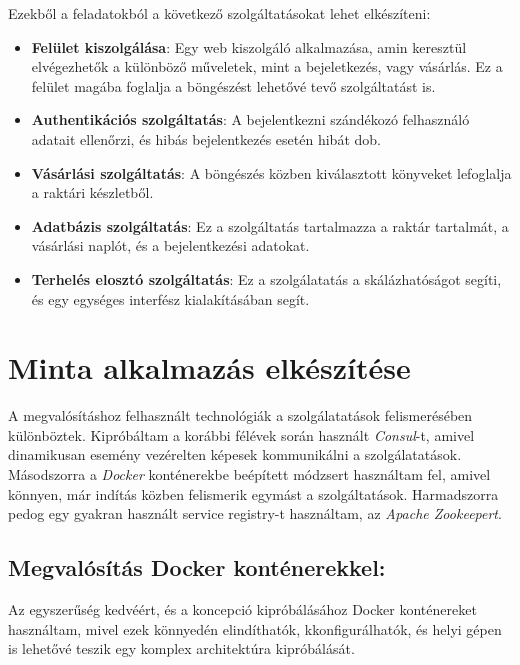 \documentclass[11pt,magyar,a4paper,oneside,]{report}
\providecommand{\tightlist}{%
  \setlength{\itemsep}{0pt}\setlength{\parskip}{0pt}}
\begin{document}
Ezekből a feladatokból a következő szolgáltatásokat lehet elkészíteni:

\begin{itemize}
\tightlist
\item
  \textbf{Felület kiszolgálása}: Egy web kiszolgáló alkalmazása, amin
  keresztül elvégezhetők a különböző műveletek, mint a bejeletkezés,
  vagy vásárlás. Ez a felület magába foglalja a böngészést lehetővé tevő
  szolgáltatást is.
\item
  \textbf{Authentikációs szolgáltatás}: A bejelentkezni szándékozó
  felhasználó adatait ellenőrzi, és hibás bejelentkezés esetén hibát
  dob.
\item
  \textbf{Vásárlási szolgáltatás}: A böngészés közben kiválasztott
  könyveket lefoglalja a raktári készletből.
\item
  \textbf{Adatbázis szolgáltatás}: Ez a szolgáltatás tartalmazza a
  raktár tartalmát, a vásárlási naplót, és a bejelentkezési adatokat.
\item
  \textbf{Terhelés elosztó szolgáltatás}: Ez a szolgálatatás a
  skálázhatóságot segíti, és egy egységes interfész kialakításában
  segít.
\end{itemize}

\chapter{Minta alkalmazás
elkészítése}\label{minta-alkalmazuxe1s-elkuxe9szuxedtuxe9se}

A megvalósításhoz felhasznált technológiák a szolgálatatások
felismerésében különböztek. Kipróbáltam a korábbi félévek során használt
\emph{Consul}-t, amivel dinamikusan esemény vezérelten képesek
kommunikálni a szolgálatatások. Másodszorra a \emph{Docker} konténerekbe
beépített módzsert használtam fel, amivel könnyen, már indítás közben
felismerik egymást a szolgáltatások. Harmadszorra pedog egy gyakran
használt service registry-t használtam, az \emph{Apache Zookeepert}.

\section{Megvalósítás Docker
konténerekkel:}\label{megvaluxf3suxedtuxe1s-docker-kontuxe9nerekkel}

Az egyszerűség kedvéért, és a koncepció kipróbálásához Docker
konténereket használtam, mivel ezek könnyedén elindíthatók,
kkonfigurálhatók, és helyi gépen is lehetővé teszik egy komplex
architektúra kipróbálását.
\end{document}
